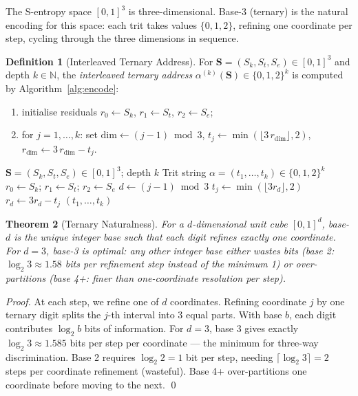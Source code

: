 \documentclass[twocolumn,10pt,a4paper]{article}
\theoremstyle{thmstyle}
\newtheorem{theorem}{Theorem}[section]
\theoremstyle{definition}
\newtheorem{definition}[theorem]{Definition}
\theoremstyle{remark}
\newcommand{\N}{\mathbb{N}}
\newcommand{\Sv}{\mathbf{S}}
\newcommand{\Sk}{S_{k}}
\newcommand{\St}{S_{t}}
\newcommand{\Se}{S_{e}}
\begin{document}
The S-entropy space $[0,1]^3$ is three-dimensional. Base-3 (ternary)
is the natural encoding for this space: each trit takes values
$\{0,1,2\}$, refining one coordinate per step, cycling through the
three dimensions in sequence.

\begin{definition}[Interleaved Ternary Address]
\label{def:ternary}
For $\Sv = (\Sk, \St, \Se) \in [0,1]^3$ and depth $k \in \N$, the
\emph{interleaved ternary address} $\alpha^{(k)}(\Sv) \in \{0,1,2\}^k$
is computed by Algorithm~\ref{alg:encode}:
\begin{enumerate}[nosep,label=(\roman*)]
\item initialise residuals $r_0 \leftarrow \Sk$,
  $r_1 \leftarrow \St$, $r_2 \leftarrow \Se$;
\item for $j = 1, \ldots, k$:
  set $\text{dim} \leftarrow (j-1) \bmod 3$,
  $t_j \leftarrow \min(\lfloor 3\,r_{\text{dim}}\rfloor, 2)$,
  $r_{\text{dim}} \leftarrow 3\,r_{\text{dim}} - t_j$.
\end{enumerate}
\end{definition}

\begin{algorithm}[h]
\caption{Interleaved Ternary Encoder}
\label{alg:encode}
\begin{algorithmic}[1]
\Require $\Sv = (\Sk,\St,\Se) \in [0,1]^3$; depth $k$
\Ensure Trit string $\alpha = (t_1,\ldots,t_k) \in \{0,1,2\}^k$
\State $r_0 \gets \Sk$;\; $r_1 \gets \St$;\; $r_2 \gets \Se$
  \State $d \gets (j-1) \bmod 3$
  \State $t_j \gets \min(\lfloor 3 r_d \rfloor, 2)$
  \State $r_d \gets 3 r_d - t_j$
\EndFor
\Return $(t_1, \ldots, t_k)$
\end{algorithmic}
\end{algorithm}

\begin{theorem}[Ternary Naturalness]
\label{thm:ternary-natural}
For a $d$-dimensional unit cube $[0,1]^d$, base-$d$ is the unique
integer base such that each digit refines exactly one coordinate. For
$d = 3$, base-3 is optimal: any other integer base either wastes bits
(base 2: $\log_2 3 \approx 1.58$ bits per refinement step instead of
the minimum 1) or over-partitions (base 4+: finer than one-coordinate
resolution per step).
\end{theorem}

\begin{proof}
At each step, we refine one of $d$ coordinates. Refining coordinate
$j$ by one ternary digit splits the $j$-th interval into 3 equal parts.
With base $b$, each digit contributes $\log_2 b$ bits of information.
For $d=3$, base 3 gives exactly $\log_2 3 \approx 1.585$ bits per step
per coordinate — the minimum for three-way discrimination. Base 2 requires
$\log_2 2 = 1$ bit per step, needing $\lceil\log_2 3\rceil = 2$ steps per
coordinate refinement (wasteful). Base 4+ over-partitions one coordinate
before moving to the next. \qed
\end{proof}
\end{document}

